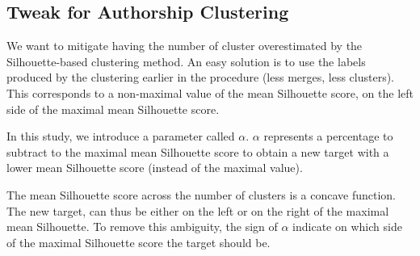 \begin{table}
  \centering
  \caption{Silhouette-based clustering evaluation (Maximal Silhouette, $\alpha = 0$), mean $B^3_{F_1}$/$r_{diff}$}
  \label{tab:silhouette-based_clustering}

\end{table}

\subsection{Tweak for Authorship Clustering}

We want to mitigate having the number of cluster overestimated by the Silhouette-based clustering method.
An easy solution is to use the labels produced by the clustering earlier in the procedure (less merges, less clusters).
This corresponds to a non-maximal value of the mean Silhouette score, on the left side of the maximal mean Silhouette score.

In this study, we introduce a parameter called $\alpha$.
$\alpha$ represents a percentage to subtract to the maximal mean Silhouette score to obtain a new target with a lower mean Silhouette score (instead of the maximal value).

The mean Silhouette score across the number of clusters is a concave function.
The new target, can thus be either on the left or on the right of the maximal mean Silhouette.
To remove this ambiguity, the sign of $\alpha$ indicate on which side of the maximal Silhouette score the target should be.

